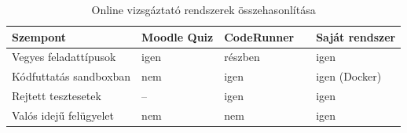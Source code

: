 \begin{table}[H]
  \centering
  \caption{Online vizsgáztató rendszerek összehasonlítása }
  \label{tab:osszehasonlitas}
  \begin{tabularx}{\textwidth}{@{}l>{\centering\arraybackslash}X>{\centering\arraybackslash}X>{\centering\arraybackslash}X>{\centering\arraybackslash}X@{}}
    \toprule
    Szempont                  & Moodle Quiz & CodeRunner & \todo{?} & Saját rendszer \\
    \midrule
    Vegyes feladattípusok     & igen        & részben    &          & igen \\
    Kódfuttatás sandboxban    & nem         & igen       &          & igen (Docker) \\
    Rejtett tesztesetek       & --          & igen       &          & igen \\
    Valós idejű felügyelet    & nem         & nem        &          & igen \\
    \bottomrule
  \end{tabularx}
\end{table}
